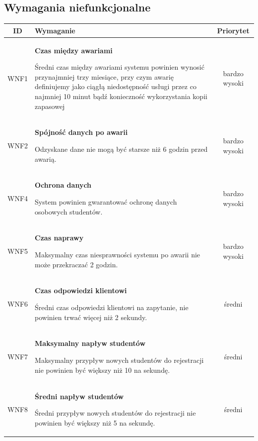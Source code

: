 {\begin{tabularx}{\textwidth}{|c|X|X|}
\end{tabularx}

\subsection[Wymagania niefunkcjonalne]{Wymagania niefunkcjonalne}


\begin{tabularx}{\textwidth}{|c|X|c|}
\hline
\textbf{ID} & \textbf{Wymaganie}  & \textbf{Priorytet} \\
\hline

\label{z:WNF1} WNF1 & \textbf{Czas między awariami} 
 
Średni czas między awariami systemu powinien wynosić przynajmniej trzy miesiące, przy czym awarię definiujemy jako ciągłą niedostępność usługi przez co najmniej 10 minut bądź konieczność wykorzystania kopii zapasowej
 & bardzo wysoki\\
\hline

\label{z:WNF2} WNF2 & \textbf{Spójność danych po awarii} 
 
Odzyskane dane nie mogą być starsze niż 6 godzin przed awarią.
 & bardzo wysoki\\
\hline

\label{z:WNF4} WNF4 & \textbf{Ochrona danych} 
 
System powinien gwarantować ochronę danych osobowych studentów.
 & bardzo wysoki\\
\hline

\label{z:WNF5} WNF5 & \textbf{Czas naprawy} 
 
Maksymalny czas niesprawności systemu po awarii nie może przekraczać 2 godzin.
 & bardzo wysoki\\
\hline

\label{z:WNF6} WNF6 & \textbf{Czas odpowiedzi klientowi} 
 
Średni czas odpowiedzi klientowi na zapytanie, nie powinien trwać więcej niż  2 sekundy.
 & średni\\
\hline

\label{z:WNF7} WNF7 & \textbf{Maksymalny napływ studentów} 
 
Maksymalny przypływ nowych studentów do rejestracji nie powinien być większy niż 10 na sekundę.
 & średni\\
\hline

\label{z:WNF8} WNF8 & \textbf{Średni napływ studentów} 
 
Średni przypływ nowych studentów do rejestracji nie powinien być większy niż 5 na sekundę.
 & średni\\
\hline


\end{tabularx}}
